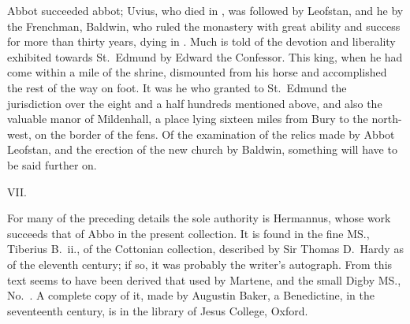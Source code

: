 \documentclass[10pt]{book}
\begin{document}
{Abbot succeeded abbot; Uvius, who died in , was followed by Leofstan, and he by the Frenchman, Baldwin, who ruled the monastery with great ability and success for more than thirty years, dying in . Much is told of the devotion and liberality exhibited towards St.\ Edmund by Edward the Confessor. This king, when he had come within a mile of the shrine, dismounted from his horse and accomplished the rest of the way on foot. It was he who granted to St.\ Edmund the jurisdiction over the eight and a half hundreds mentioned above, and also the valuable manor of Mildenhall, a place lying sixteen miles from Bury to the north-west, on the border of the fens. Of the examination of the relics made by Abbot Leofstan, and the erection of the new church by Baldwin, something will have to be said further on.

\vspace{.3cm}
\begin{center}
VII.
\end{center}
\noindent For many of the preceding details the sole authority is Hermannus, whose work succeeds that of Abbo in the present collection. It is found in the fine MS., Tiberius B.\ ii., of the Cottonian collection, described by Sir Thomas D.\ Hardy as of the eleventh century; if so, it was probably the writer's autograph. From this text seems to have been derived that used by Martene, and the small Digby MS., No.\ . A complete copy of it, made by Augustin Baker, a Benedictine, in the seventeenth century, is in the library of Jesus College, Oxford.

}
\end{document}
